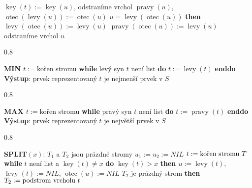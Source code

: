 \documentclass[a4paper,12pt]{article}
\DeclareMathOperator*{\otec}{otec}
\DeclareMathOperator*{\levy}{levy}
\DeclareMathOperator*{\pravy}{pravy}
\DeclareMathOperator*{\key}{key}
\newcommand{\algoritmus}[1]{
  {
  \setlength\fboxrule{0.5pt}

  \begin{boxedminipage}{0.8\textwidth}

 #1
  \end{boxedminipage}

  }
  }
\begin{document}
{\newline 
\phantom{------}$\key(t):=\key(u)$, odstraníme vrchol $\pravy(u)$,\newline 
\phantom{------}$\otec(\levy(u)):=\otec(u)$\newline 
{} $u=\levy(\otec(u))$ {\bf \textsf{then}}\newline 
\phantom{---------}$\levy(\otec(u)):=\levy(u)$\newline 
{}\newline 
\phantom{---------}$\pravy(\otec(u)):=\levy(u)$\newline 
{}
\phantom{------}odstraníme vrchol $u$\newline 
{}
}\algoritmus{
{\bf MIN\newline 
$t:=$}kořen stromu\newline 
{\bf \textsf{while}} levý syn $t$ není list {\bf \textsf{do}} $t:=\levy(t)$ {\bf \textsf{enddo}\newline 
Výstup}: prvek reprezentovaný $t$ je nejmenší prvek v $
S$
}\algoritmus{
{\bf MAX\newline 
$t:=$}kořen stromu\newline 
{\bf \textsf{while}} pravý syn $t$ není list {\bf \textsf{do}} $t:=\pravy(t)$ {\bf \textsf{enddo}\newline 
Výstup}: prvek reprezentovaný $t$ je největší prvek v $
S$
}\algoritmus{
{\bf SPLIT$(x)$}:\newline 
$T_1$ a $T_2$ jsou prázdné stromy\newline 
$u_1:=u_2:=NIL$\newline 
$t:=\text{\rm kořen stromu }T$\newline 
{\bf \textsf{while}} $t$ není list a $\key(t)\ne x$ {\bf \textsf{do}\newline}
\phantom{---}{\bf \textsf{if}} $\key(t)>x$ {\bf \textsf{then}\newline 
\phantom{------}$u:=\levy(t)$}, $\levy(t):=NIL$, $\otec(u):=NIL$\newline 
\phantom{------}{\bf \textsf{if}} $T_2$ je prázdný strom {\bf \textsf{then}}\newline \phantom{---------}$T_2:=\text{\rm podstrom vrcholu }t$\newline
\phantom{------}{\bf \textsf{else}}\newline 
}
\end{document}
